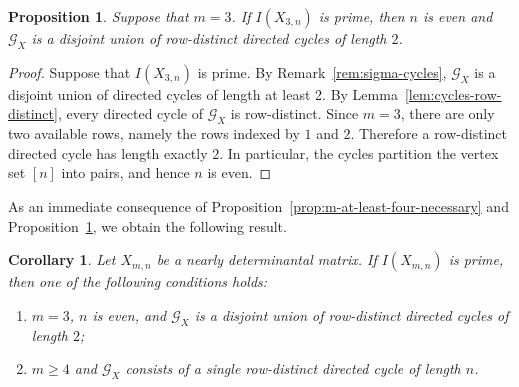 \documentclass[12pt]{amsart}
\numberwithin{equation}{section}
\newtheorem{Corollary}[Theorem]{Corollary}
\newtheorem{Proposition}[Theorem]{Proposition}
\begin{document}
\begin{Proposition}\label{prop:m-equals-three-necessary}
Suppose that $m=3$. If $I(X_{3,n})$ is prime, then $n$ is even and
$\mathcal G_X$ is a disjoint union of row-distinct directed cycles of
length $2$.
\end{Proposition}

\begin{proof}
Suppose that $I(X_{3,n})$ is prime. By Remark~\ref{rem:sigma-cycles},  $\mathcal G_X$ is a disjoint union of directed
cycles of length at least 2. By Lemma~\ref{lem:cycles-row-distinct}, every directed cycle of
$\mathcal G_X$ is row-distinct. Since $m=3$, there are only two
available rows, namely the rows indexed by $1$ and $2$. Therefore a
row-distinct directed cycle has length exactly $2$. In particular, the cycles
partition the vertex set $[n]$ into pairs, and hence $n$
is even.
\end{proof}


As an immediate consequence of Proposition~\ref{prop:m-at-least-four-necessary} and Proposition~\ref{prop:m-equals-three-necessary}, we obtain the following result. 


\begin{Corollary}\label{cor:main-classification}
Let $X_{m,n}$ be a nearly determinantal matrix. If $I(X_{m,n})$ is prime, then one of the following conditions
holds:
\begin{enumerate}
    \item[{\em(i)}] $m=3$, $n$ is even, and $\mathcal G_X$ is a
    disjoint union of row-distinct directed cycles of length $2$;

    \item[{\em(ii)}] $m\geq4$ and $\mathcal G_X$ consists of a single
    row-distinct directed cycle of length $n$.
\end{enumerate}
    
\end{Corollary}



\end{document}
